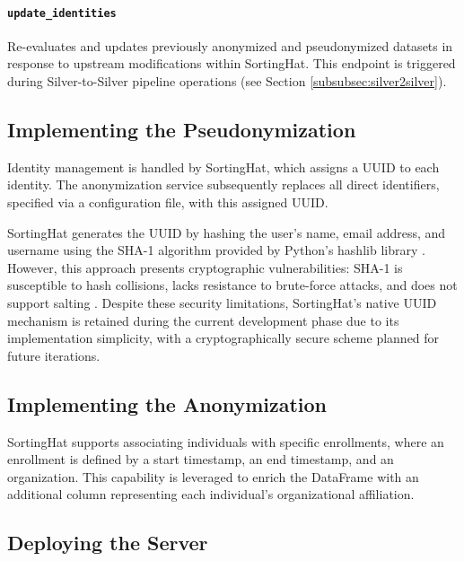 \paragraph{\texttt{update\_identities}}
Re-evaluates and updates previously anonymized and pseudonymized datasets in response to upstream modifications within SortingHat. This endpoint is triggered during Silver-to-Silver pipeline operations (see Section \ref{subsubsec:silver2silver}).


\subsection{Implementing the Pseudonymization}
\label{subsec:implementing_pseudonymization}

Identity management is handled by SortingHat, which assigns a \ac{UUID} to each identity. The anonymization service subsequently replaces all direct identifiers, specified via a configuration file, with this assigned \ac{UUID}. 

SortingHat generates the \ac{UUID} by hashing the user's name, email address, and username using the SHA-1 algorithm provided by Python's hashlib library \autocite{sortinghat_repo}. However, this approach presents cryptographic vulnerabilities: SHA-1 is susceptible to hash collisions, lacks resistance to brute-force attacks, and does not support salting \autocite{python_hashlib_2026}. Despite these security limitations, SortingHat's native \ac{UUID} mechanism is retained during the current development phase due to its implementation simplicity, with a cryptographically secure scheme planned for future iterations.

\subsection{Implementing the Anonymization}
\label{subsec:implementing_anonymization}

SortingHat supports associating individuals with specific enrollments, where an enrollment is defined by a start timestamp, an end timestamp, and an organization. This capability is leveraged to enrich the DataFrame with an additional column representing each individual's organizational affiliation.


\subsection{Deploying the Server}
\label{subsec:deploying_the_server}

